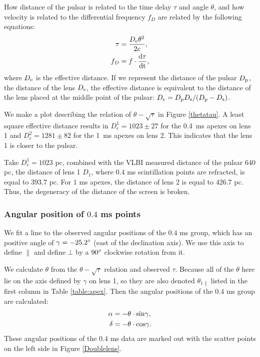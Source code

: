 \documentclass[useAMS,usenatbib]{mn2e}
\begin{document}
How distance of the pulsar is related to the time delay $\tau$ and angle $\theta$, and how velocity is related to the differential frequency $f_D$ are related by the following equations:
\begin{align*}
\tau &=\frac{D_{\rm e}{\theta}^2}{2c}, \\
f_D  &=f\cdot\frac{\rm d\tau}{\rm dt},
\end{align*} 
where ${D_{\rm e}}$ is the effective distance. If we represent the distance of the pulsar $D_{\rm p}$, the distance of the lens $D_{\rm s}$, the effective distance is equivalent to the distance of the lens placed at the middle point of the pulsar: $D_{\rm e}={D_{\rm p} D_{\rm s}}/({D_{\rm p} - D_{\rm s}})$. 

We make a plot describing the relation of $\theta-\sqrt{\tau}$ in Figure \ref{thetatau}. A least square effective distance results in
$D_e^1=1023\pm 27$ for the  0.4\ ms apexes on lens 1 and
$D_e^2 = 1281 \pm 82$ for the 1\ ms apexes on lens 2. This indicates that the lens 1 is closer to the pulsar. 

Take $D_e^1=1023$ pc, combined with the VLBI measured distance of the pulsar $640$ pc, the distance of lens 1 $D_{1}$, where $0.4$ ms scintillation points are refracted, is equal to $393.7$ pc. 
For $1$ ms apexes, the distance of lens 2 is equal to $426.7$ pc. Thus, the degeneracy of the distance of the screen is broken.

\subsubsection{Angular position of $0.4$ ms points}
We fit a line to the observed angular positions of the $0.4$ ms group, which has an positive angle of $\gamma=-25.2\degree$ (east of the declination axis). We use this axis to define ${\parallel}$ and define ${\bot}$ by a $90\degree$ clockwise rotation from it. 

We calculate $\theta$ from the $\theta-\sqrt{\tau}$ relation and observed $\tau$. Because all of the $\theta$ here lie on the axis defined by $\gamma$ on lens 1, so they are also denoted $\theta_{1\parallel}$ listed in the first column in Table \ref{table:apex}. Then the angular positions of the $0.4$ ms group are calculated:
\begin{align*}
{\alpha}&=-\theta \cdot {\rm sin}\gamma, \\
{\delta}&=-\theta \cdot {\rm cos}\gamma.
\end{align*}
These angular positions of the $0.4$ ms data are marked out with the scatter points on the left side in Figure \ref{Doublelens}.
\end{document}
